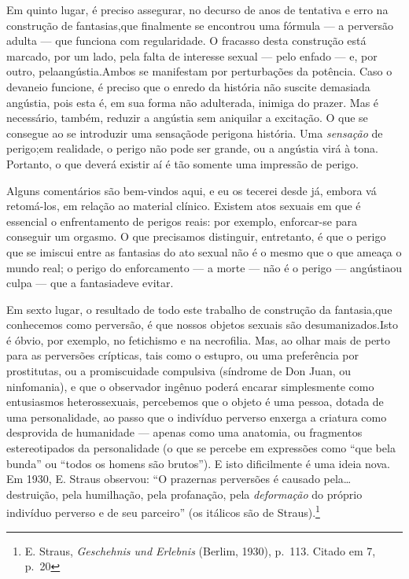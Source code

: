 Em quinto lugar, é preciso assegurar, no decurso de anos de
tentativa e erro na construção de fantasias,\idxfantacons[|(] que finalmente se
encontrou uma fórmula --- a perversão adulta --- que funciona com
regularidade. O fracasso desta construção está marcado, por um lado,
pela falta de interesse sexual --- pelo\idxpervenfad{} enfado\idxenfa{} --- e, por outro, pela\idxfantaangu[|(]
angústia.\idxangu[|(] Ambos se manifestam por perturbações da potência. Caso o
devaneio funcione, é preciso que o enredo da história não suscite
demasiada angústia, pois esta é, em sua forma não adulterada, inimiga
do prazer. Mas é necessário, também, reduzir a angústia sem aniquilar a
excitação. O que se consegue ao se introduzir uma sensação\idxperigo[|(] de perigo\idxfantaexpo[|(] na
história. Uma \textit{sensação} de perigo;\idxpervexpos[|(] em realidade, o perigo não
pode ser grande, ou a angústia virá à tona. Portanto, o que deverá
existir aí é tão somente uma impressão de perigo.

Alguns comentários são bem-vindos aqui, e eu os tecerei desde já,
embora vá retomá-los, em relação ao material clínico. Existem atos
sexuais em que é essencial o enfrentamento de perigos reais: por
exemplo, enforcar-se\idxenfor{} para conseguir um orgasmo. O que precisamos
distinguir, entretanto, é que o perigo que se imiscui entre as
fantasias do ato sexual não é o mesmo que o que ameaça o mundo real; o
perigo do enforcamento --- a morte --- não é o perigo --- angústia\idxfantaangu[|)] ou culpa ---
que a fantasia\idxangu[|)] deve evitar.\idxperigo[|)]

Em sexto lugar, o resultado de todo este trabalho de construção da
fantasia,\idxfanta[|)] que conhecemos como perversão, é que nossos objetos sexuais
são desumanizados.\idxdesufant[|(] Isto é óbvio, por exemplo, no fetichismo\idxfetic{} e na
necrofilia.\idxnecro{} Mas, ao olhar mais de perto para as perversões crípticas,
tais como o estupro,\idxestup{} ou uma preferência por prostitutas,\idxprost{} ou a
promiscuidade\idxpromiscomp{} compulsiva (síndrome de Don Juan,\idxdonj{} ou ninfomania), e que o
observador ingênuo poderá encarar simplesmente como entusiasmos
heterossexuais, percebemos que o objeto é uma pessoa, dotada de uma
personalidade, ao passo que o indivíduo perverso enxerga a criatura
como desprovida de humanidade --- apenas como uma anatomia, ou fragmentos
estereotipados da personalidade (o que se percebe em expressões como
``que bela bunda'' ou ``todos os homens são brutos''). E isto dificilmente é uma ideia
nova. Em 1930, E. Straus\idxstraus{} observou: ``O prazer\idxpraz[|(] nas
perversões é causado pela\ldots{} destruição, pela humilhação, pela
profanação, pela \textit{deformação} do próprio indivíduo perverso e de
seu parceiro'' (os itálicos são de Straus).\footnote{ E.
Straus, \textit{Geschehnis und Erlebnis} (Berlim, 1930), p.~113. Citado
em 7, p.~20}

